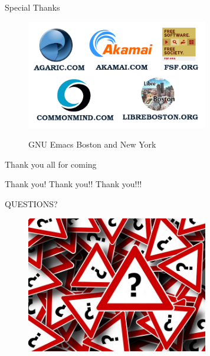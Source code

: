 \documentclass[english,14pt,presentation]{beamer}
\begin{document}
\begin{frame}{Special Thanks}
\begin{figure}
\centering
\includegraphics[width=300]{images/thanks.png}
\item GNU Emacs Boston and New York
\end{figure}
\end{frame}

\begin{frame}{Thank you all for coming}
\item Thank you! Thank you!! Thank you!!!
\end{frame}

\begin{frame}{QUESTIONS?}
\begin{figure}
\centering
\includegraphics[width=300]{images/q.png}
\end{figure}
\end{frame}
\end{document}
